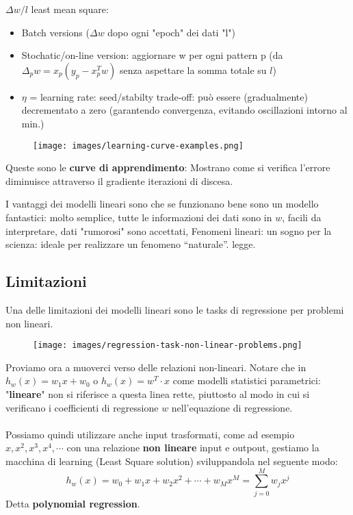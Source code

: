 $\Delta w/l$ least mean square:
\begin{itemize}
    \item Batch versions ($\Delta w$ dopo ogni "epoch" dei dati "l")
    \item Stochatic/on-line version: aggiornare w per ogni pattern p (da $\Delta_p w = x_p (y_p - x_p^T w)$ senza aspettare la somma totale su $l$)
    \item $\eta$ = learning rate: seed/stabilty trade-off: può essere (gradualmente) decrementato a zero (garantendo convergenza, 
    evitando oscillazioni intorno al min.)
\end{itemize}
\begin{figure}[h!]
    \centering
    \texttt{[image: images/learning-curve-examples.png]}
\end{figure}
\begin{definition}
    Queste sono le \textbf{curve di apprendimento}: Mostrano come si verifica l'errore diminuisce attraverso il gradiente iterazioni di discesa.
\end{definition}
I vantaggi dei modelli lineari sono che se funzionano bene sono un modello fantastici: molto semplice,
tutte le informazioni dei dati sono in $w$, facili da interpretare, dati "rumorosi" sono accettati, Fenomeni lineari: un sogno per la scienza: ideale per realizzare un fenomeno “naturale”.
legge.

\subsection{Limitazioni}
Una delle limitazioni dei modelli lineari sono le tasks di regressione per problemi non lineari.
\begin{figure}[h!]
    \centering
    \texttt{[image: images/regression-task-non-linear-problems.png]}
\end{figure}

\hspace{-15pt}Proviamo ora a muoverci verso delle relazioni non-lineari. Notare che in $h_w(x) = w_1 x + w_0$ o $h_w(x) = w^T \cdot x$ 
come modelli statistici parametrici: "\textbf{lineare}" non si riferisce a questa linea rette, piuttosto al modo in cui
si verificano i coefficienti di regressione $w$ nell'equazione di regressione.\\\\
Possiamo quindi utilizzare anche input trasformati, come ad esempio $x, x^2, x^3, x^4, \cdots$ con una relazione \textbf{non lineare} input e outpout, 
gestiamo la macchina di learning (Least Square solution) sviluppandola nel seguente modo:
$$h_w(x) = w_0 + w_1 x + w_2 x^2 + \cdots + w_Mx^M = \sum_{j=0}^{M}w_j x^j$$
Detta \textbf{polynomial regression}.

